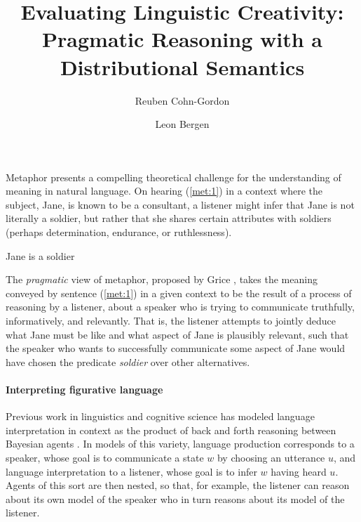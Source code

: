 \documentclass[9pt,twocolumn,twoside,lineno]{pnas-new}
\title{Evaluating Linguistic Creativity:\\ Pragmatic Reasoning with a Distributional Semantics}
\author[a]{Reuben Cohn-Gordon}
\author[b]{Leon Bergen}
\affil[a]{Stanford University}
\affil[b]{University of California San Diego}
\begin{document}
\maketitle
\thispagestyle{firststyle}


Metaphor presents a compelling theoretical challenge for the understanding of meaning in natural language. On hearing (\ref{met:1}) in a context where the subject, Jane, is known to be a consultant, a listener might infer that Jane is not literally a soldier, but rather that she shares certain attributes with soldiers (perhaps determination, endurance, or ruthlessness). 
	\begin{examples}
	\item Jane is a soldier \label{met:1}
	\end{examples}

The \emph{pragmatic} view of metaphor, proposed by Grice \cite{grice}, takes the meaning conveyed by sentence (\ref{met:1}) in a given context to be the result of a process of reasoning by a listener, about a speaker who is trying to communicate truthfully, informatively, and relevantly. That is, the listener attempts to jointly deduce what Jane must be like and what aspect of Jane is plausibly relevant, such that the speaker who wants to successfully communicate some aspect of Jane would have chosen the predicate \emph{soldier} over other alternatives.




\paragraph{Interpreting figurative language}
Previous work in linguistics and cognitive science has modeled language interpretation in context as the product of back and forth reasoning between Bayesian agents \cite{frank2012predicting}. In models of this variety, language production corresponds to a speaker, whose goal is to communicate a state $w$ by choosing an utterance $u$, and language interpretation to a listener, whose goal is to infer $w$ having heard $u$. Agents of this sort are then nested, so that, for example, the listener can reason about its own model of the speaker who in turn reasons about its model of the listener.
\end{document}
